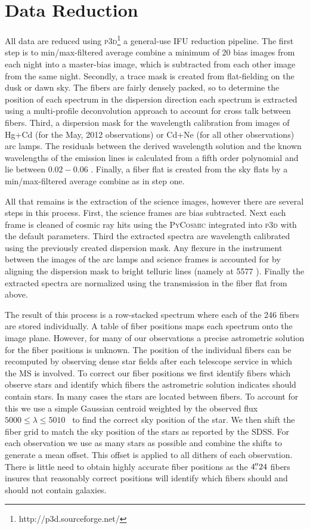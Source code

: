 \section{Data Reduction}\label{2sec:data reduction} 
All data are reduced using \textsc{p3d}\footnote{http://p3d.sourceforge.net/} \citep{Sandin2010} a general-use IFU reduction pipeline. The first step is to min/max-filtered average combine a minimum of 20 bias images from each night into a master-bias image, which is subtracted from each other image from the same night. Secondly, a trace mask is created from flat-fielding on the dusk or dawn sky. The fibers are fairly densely packed, so to determine the position of each spectrum in the dispersion direction each spectrum is extracted using a multi-profile deconvolution approach \citep{Sharp2010} to account for cross talk between fibers. Third, a dispersion mask for the wavelength calibration from images of Hg+Cd (for the May, 2012 observations) or Cd+Ne (for all other observations) arc lamps. The residuals between the derived wavelength solution and the known wavelengths of the emission lines is calculated from a fifth order polynomial and lie between $0.02 - 0.06$ \AAA. Finally, a fiber flat is created from the sky flats by a min/max-filtered average combine as in step one. 

All that remains is the extraction of the science images, however there are several steps in this process. First, the science frames are bias subtracted. Next each frame is cleaned of cosmic ray hits using the \textsc{PyCosmic} \citep{Husemann2012} integrated into \textsc{p3d} with the default parameters. Third the extracted spectra are wavelength calibrated using the previously created dispersion mask. Any flexure in the instrument between the images of the arc lamps and science frames is accounted for by aligning the dispersion mask to bright telluric lines (namely \hbox{} at 5577 \AAA). Finally the extracted spectra are normalized using the transmission in the fiber flat from above.

The result of this process is a row-stacked spectrum where each of the 246 fibers are stored individually. A table of fiber positions maps each spectrum onto the image plane. However, for many of our observations a precise astrometric solution for the fiber positions is unknown. The position of the individual fibers can be recomputed by observing dense star fields after each telescope service in which the MS is involved. To correct our fiber positions we first identify fibers which observe stars and identify which fibers the astrometric solution indicates should contain stars. In many cases the stars are located between fibers. To account for this we use a simple Gaussian centroid weighted by the observed flux $5000 \leq \lambda \leq 5010$ \AAA\ to find the correct sky position of the star. We then shift the fiber grid to match the sky position of the stars as reported by the SDSS. For each observation we use as many stars as possible and combine the shifts to generate a mean offset. This offset is applied to all dithers of each observation. There is little need to obtain highly accurate fiber positions as the $4\mbox{\ensuremath{.\!\!^{\prime\prime}}}24$ fibers insures that reasonably correct positions will identify which fibers should and should not contain galaxies.

